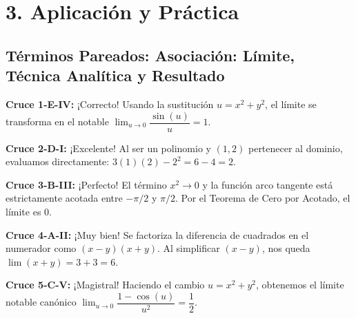 \documentclass[11pt]{article}
\newenvironment{aplicacion}{%
  \section*{3. Aplicación y Práctica}%
}{}
\newenvironment{pareadostrescolumnas}[1]{\subsection*{Términos Pareados: #1}}{\vspace{0.3cm}}
\newcommand{\pareotres}[2]{\textbf{Cruce #1:} #2\par}
\begin{document}
\begin{aplicacion}
\begin{pareadostrescolumnas}{Asociación: Límite, Técnica Analítica y Resultado}
    \pareotres{1-E-IV}{¡Correcto! Usando la sustitución $u = x^2+y^2$, el límite se transforma en el notable $\displaystyle \lim_{u\to0} \dfrac{\sin(u)}{u} = 1$.}
    \pareotres{2-D-I}{¡Excelente! Al ser un polinomio y $(1,2)$ pertenecer al dominio, evaluamos directamente: $3(1)(2) - 2^2 = 6 - 4 = 2$.}
    \pareotres{3-B-III}{¡Perfecto! El término $x^2 \to 0$ y la función arco tangente está estrictamente acotada entre $-\pi/2$ y $\pi/2$. Por el Teorema de Cero por Acotado, el límite es $0$.}
    \pareotres{4-A-II}{¡Muy bien! Se factoriza la diferencia de cuadrados en el numerador como $(x-y)(x+y)$. Al simplificar $(x-y)$, nos queda $\displaystyle \lim (x+y) = 3+3 = 6$.}
    \pareotres{5-C-V}{¡Magistral! Haciendo el cambio $u = x^2+y^2$, obtenemos el límite notable canónico $\displaystyle \lim_{u\to0} \dfrac{1-\cos(u)}{u^2} = \dfrac{1}{2}$.}

  \end{pareadostrescolumnas}

\end{aplicacion}
\end{document}
